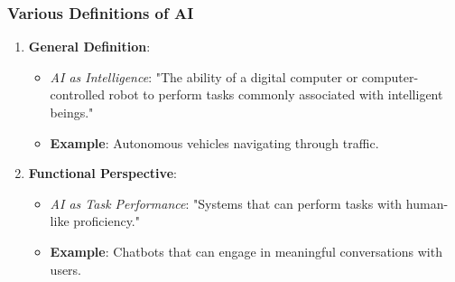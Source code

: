 \documentclass[aspectratio=169]{beamer}
\begin{document}
\begin{frame}[fragile]
    \frametitle{Various Definitions of AI}
    \begin{enumerate}
        \item \textbf{General Definition}:
        \begin{itemize}
            \item \textit{AI as Intelligence}: "The ability of a digital computer or computer-controlled robot to perform tasks commonly associated with intelligent beings."
            \item \textbf{Example}: Autonomous vehicles navigating through traffic.
        \end{itemize}
        
        \item \textbf{Functional Perspective}:
        \begin{itemize}
            \item \textit{AI as Task Performance}: "Systems that can perform tasks with human-like proficiency."
            \item \textbf{Example}: Chatbots that can engage in meaningful conversations with users.
        \end{itemize}
    \end{enumerate}
\end{frame}
\end{document}
